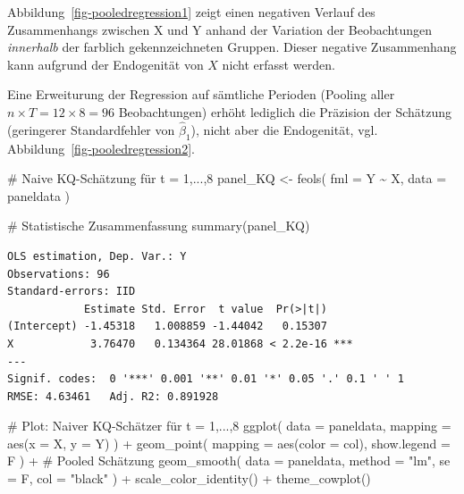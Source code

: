 \documentclass[
  a4paper,
  DIV=11,
  oneside]{scrreprt}
\newenvironment{Shaded}{\begin{snugshade}}{\end{snugshade}}
\newcommand{\AttributeTok}[1]{\textcolor[rgb]{0.40,0.45,0.13}{#1}}
\newcommand{\CommentTok}[1]{\textcolor[rgb]{0.37,0.37,0.37}{#1}}
\newcommand{\FunctionTok}[1]{\textcolor[rgb]{0.28,0.35,0.67}{#1}}
\newcommand{\NormalTok}[1]{\textcolor[rgb]{0.00,0.23,0.31}{#1}}
\newcommand{\OtherTok}[1]{\textcolor[rgb]{0.00,0.23,0.31}{#1}}
\newcommand{\SpecialCharTok}[1]{\textcolor[rgb]{0.37,0.37,0.37}{#1}}
\newcommand{\StringTok}[1]{\textcolor[rgb]{0.13,0.47,0.30}{#1}}
\begin{document}
Abbildung~\ref{fig-pooledregression1} zeigt einen negativen Verlauf des
Zusammenhangs zwischen X und Y anhand der Variation der Beobachtungen
\emph{innerhalb} der farblich gekennzeichneten Gruppen. Dieser negative
Zusammenhang kann aufgrund der Endogenität von \(X\) nicht erfasst
werden.

Eine Erweiturung der Regression auf sämtliche Perioden (Pooling aller
\(n\times T = 12 \times 8 = 96\) Beobachtungen) erhöht lediglich die
Präzision der Schätzung (geringerer Standardfehler von
\(\widehat{\beta}_1\)), nicht aber die Endogenität, vgl.
Abbildung~\ref{fig-pooledregression2}.

\begin{Shaded}
\begin{Highlighting}[]
\CommentTok{\# Naive KQ{-}Schätzung für t = 1,...,8}
\NormalTok{panel\_KQ }\OtherTok{\textless{}{-}} \FunctionTok{feols}\NormalTok{(}
  \AttributeTok{fml =}\NormalTok{ Y }\SpecialCharTok{\textasciitilde{}}\NormalTok{ X, }
  \AttributeTok{data =}\NormalTok{ paneldata }
\NormalTok{)}

\CommentTok{\# Statistische Zusammenfassung}
\FunctionTok{summary}\NormalTok{(panel\_KQ)}
\end{Highlighting}
\end{Shaded}

\begin{verbatim}
OLS estimation, Dep. Var.: Y
Observations: 96
Standard-errors: IID 
            Estimate Std. Error  t value  Pr(>|t|)    
(Intercept) -1.45318   1.008859 -1.44042   0.15307    
X            3.76470   0.134364 28.01868 < 2.2e-16 ***
---
Signif. codes:  0 '***' 0.001 '**' 0.01 '*' 0.05 '.' 0.1 ' ' 1
RMSE: 4.63461   Adj. R2: 0.891928
\end{verbatim}

\begin{Shaded}
\begin{Highlighting}[]
\CommentTok{\# Plot: Naiver KQ{-}Schätzer für t = 1,...,8}
\FunctionTok{ggplot}\NormalTok{(}
  \AttributeTok{data =}\NormalTok{ paneldata,}
  \AttributeTok{mapping =} \FunctionTok{aes}\NormalTok{(}\AttributeTok{x =}\NormalTok{ X, }\AttributeTok{y =}\NormalTok{ Y)}
\NormalTok{) }\SpecialCharTok{+}
  \FunctionTok{geom\_point}\NormalTok{(}
    \AttributeTok{mapping =} \FunctionTok{aes}\NormalTok{(}\AttributeTok{color =}\NormalTok{ col),}
    \AttributeTok{show.legend =}\NormalTok{ F}
\NormalTok{  ) }\SpecialCharTok{+}
  \CommentTok{\# Pooled Schätzung}
  \FunctionTok{geom\_smooth}\NormalTok{(}
    \AttributeTok{data =}\NormalTok{ paneldata,}
    \AttributeTok{method =} \StringTok{"lm"}\NormalTok{, }
    \AttributeTok{se =}\NormalTok{ F,}
    \AttributeTok{col =} \StringTok{"black"}
\NormalTok{  ) }\SpecialCharTok{+}
  \FunctionTok{scale\_color\_identity}\NormalTok{() }\SpecialCharTok{+}
  \FunctionTok{theme\_cowplot}\NormalTok{()}
\end{Highlighting}
\end{Shaded}
\end{document}
